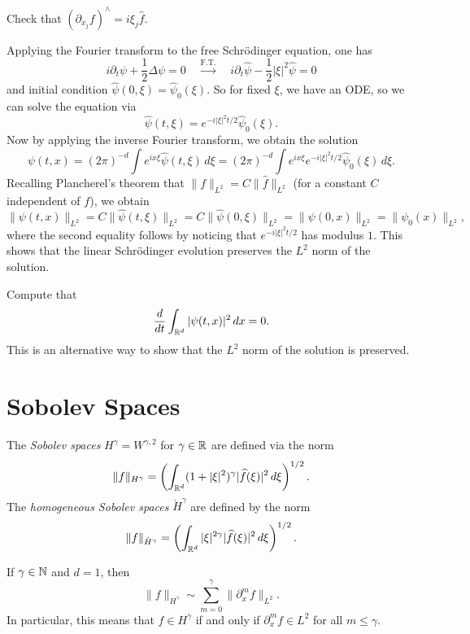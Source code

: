 \begin{exercise}
  Check that $(\partial_{x_j} f)^\wedge = i \xi_j \widehat{f}$.
\end{exercise}

Applying the Fourier transform to the free Schr\"odinger
equation, one has
\[
  i \partial_t \psi + \frac{1}{2} \Delta \psi = 0 \quad
  \xrightarrow{\text{F.T.}} \quad
  i \partial_t \widehat{\psi} - \frac{1}{2} |\xi|^2 \widehat{\psi} = 0
\]
and initial condition $\widehat{\psi}(0, \xi) = \widehat{\psi}_0(\xi)$.
So for fixed $\xi$, we have an ODE, so we
can solve the equation via
\[
  \widehat{\psi}(t, \xi) =
  e^{-i |\xi|^2 t / 2} \widehat{\psi}_0(\xi).
\]
Now by applying the inverse Fourier transform, we obtain
the solution
\[
  \psi(t, x) = (2\pi)^{-d} \int e^{ix\xi} \widehat{\psi}(t, \xi)\, d\xi
  = (2\pi)^{-d} \int e^{ix\xi} e^{-i |\xi|^2 t / 2} \widehat{\psi}_0(\xi)\, d\xi.
\]
Recalling Plancherel's theorem that
$\|f\|_{L^2} = C\|\widehat{f}\|_{L^2}$ (for a constant
$C$ independent of $f$), we obtain
\[
  \|\psi(t, x)\|_{L^2}
  = C\|\widehat{\psi}(t, \xi)\|_{L^2}
  = C\|\widehat{\psi}(0, \xi)\|_{L^2}
  = \|\psi(0, x)\|_{L^2}
  = \|\psi_0(x)\|_{L^2},
\]
where the second equality follows by noticing that
$e^{-i |\xi|^2 t / 2}$ has modulus $1$. This
shows that the linear Schr\"odinger
evolution preserves the $L^2$ norm of the solution.

\begin{exercise}
  Compute that
  \[
    \frac{d}{dt} \int_{\mathbb{R}^d} |\psi(t, x)|^2\, dx = 0.
  \]
  This is an alternative way to show that
  the $L^2$ norm of the solution is preserved.
\end{exercise}

\section{Sobolev Spaces}
\begin{definition}
  The \emph{Sobolev spaces} $H^{\gamma} = W^{\gamma, 2}$
  for $\gamma \in \mathbb{R}$
  are defined via the norm
  \[
    \|f\|_{H^{\gamma}}
    = \left(\int_{\mathbb{R}^d} (1 + |\xi|^2)^\gamma |\widehat{f}(\xi)|^2\, d\xi\right)^{1 / 2}.
  \]
  The \emph{homogeneous Sobolev spaces} $\dot{H}^\gamma$
  are defined by the norm
  \[
    \|f\|_{\dot{H}^\gamma}
    = \left(\int_{\mathbb{R}^d} |\xi|^{2\gamma} |\widehat{f}(\xi)|^2\, d\xi\right)^{1 / 2}.
  \]
\end{definition}

\begin{remark}
  If $\gamma \in \mathbb{N}$ and $d = 1$, then
  \[
    \|f\|_{H^{\gamma}}
    \sim \sum_{m = 0}^\gamma \| \partial_x^m f \|_{L^2}.
  \]
  In particular, this means that
  $f \in H^\gamma$ if and only if
  $\partial_x^m f \in L^2$ for all $m \le \gamma$.
\end{remark}


